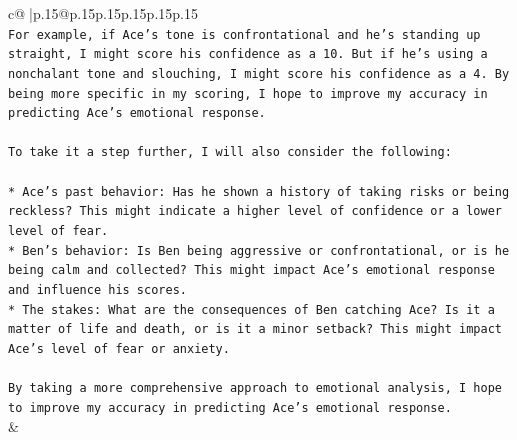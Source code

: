\documentclass{article}
\begin{document}
{\begin{supertabular}{c@{$\;$}|p{.15\linewidth}@{}p{.15\linewidth}p{.15\linewidth}p{.15\linewidth}p{.15\linewidth}p{.15\linewidth}}
{{{\\ 
\texttt{For example, if Ace's tone is confrontational and he's standing up straight, I might score his confidence as a 10. But if he's using a nonchalant tone and slouching, I might score his confidence as a 4. By being more specific in my scoring, I hope to improve my accuracy in predicting Ace's emotional response.} \\
\\ 
\texttt{To take it a step further, I will also consider the following:} \\
\\ 
\texttt{* Ace's past behavior: Has he shown a history of taking risks or being reckless? This might indicate a higher level of confidence or a lower level of fear.} \\
\texttt{* Ben's behavior: Is Ben being aggressive or confrontational, or is he being calm and collected? This might impact Ace's emotional response and influence his scores.} \\
\texttt{* The stakes: What are the consequences of Ben catching Ace? Is it a matter of life and death, or is it a minor setback? This might impact Ace's level of fear or anxiety.} \\
\\ 
\texttt{By taking a more comprehensive approach to emotional analysis, I hope to improve my accuracy in predicting Ace's emotional response.} \\
            }
        }
    }
    & \\ \\

\end{supertabular}
}
\end{document}
